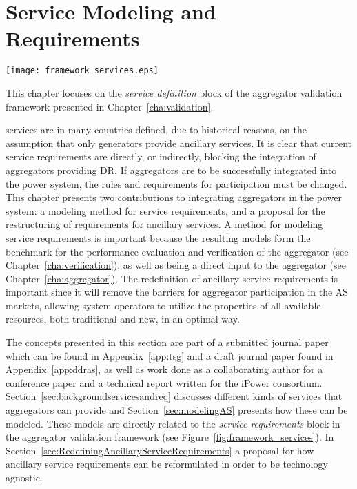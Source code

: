 \chapter{Service Modeling and Requirements} %
\label{cha:services}
\begin{marginfigure}
	\texttt{[image: framework\_services.eps]}
	\caption{This chapter focuses on the \emph{service definition} block of the aggregator validation framework presented in Chapter~\ref{cha:validation}.}
      \label{fig:framework_services}
\end{marginfigure}

 services are in many countries defined, due to historical reasons, on the assumption that only generators provide ancillary services. It is clear that current service requirements are directly, or indirectly, blocking the integration of aggregators providing DR. If aggregators are to be successfully integrated into the power system, the rules and requirements for participation must be changed. This chapter presents two contributions to integrating aggregators in the power system: a modeling method for service requirements, and a proposal for the restructuring of requirements for ancillary services. A method for modeling service requirements is important because the resulting models form the benchmark for the performance evaluation and verification of the aggregator (see Chapter~\ref{cha:verification}), as well as being a direct input to the aggregator (see Chapter~\ref{cha:aggregator}). The redefinition of ancillary service requirements is important since it will remove the barriers for aggregator participation in the AS markets, allowing system operators to utilize the properties of all available resources, both traditional and new, in an optimal way. 

The concepts presented in this section are part of a submitted journal paper which can be found in Appendix~\ref{app:tsg} and a draft journal paper found in Appendix~\ref{app:ddras}, as well as work done as a collaborating author for a conference paper and a technical report written for the iPower consortium. Section~\ref{sec:backgroundservicesandreq} discusses different kinds of services that aggregators can provide and Section~\ref{sec:modelingAS} presents how these can be modeled. These models are directly related to the \emph{service requirements} block in the aggregator validation framework (see Figure~\ref{fig:framework_services}). In Section~\ref{sec:RedefiningAncillaryServiceRequirements} a proposal for how ancillary service requirements can be reformulated in order to be technology agnostic. 

